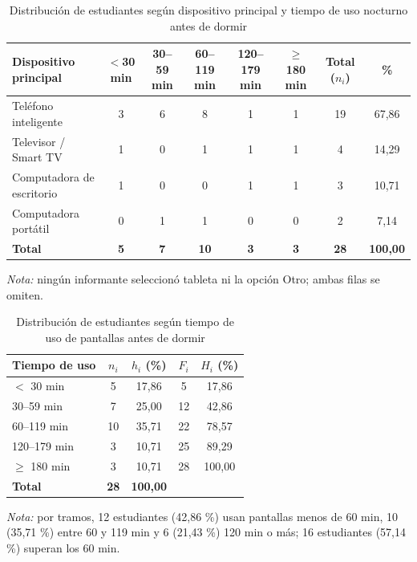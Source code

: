 \begin{table}[H]
\centering
\caption{Distribución de estudiantes según dispositivo principal y tiempo de uso nocturno antes de dormir}
\label{tab:c1}
\scriptsize
\setlength{\tabcolsep}{4pt}
\begin{tabular}{lccccccc}
\toprule
\textbf{Dispositivo principal} & \textbf{$<$30 min} & \textbf{30--59 min} & \textbf{60--119 min} & \textbf{120--179 min} & \textbf{$\ge$180 min} & \textbf{Total ($n_i$)} & \textbf{\%} \\
\midrule
Teléfono inteligente & 3 & 6 & 8 & 1 & 1 & 19 & 67,86 \\
Televisor / Smart TV & 1 & 0 & 1 & 1 & 1 & 4 & 14,29 \\
Computadora de escritorio & 1 & 0 & 0 & 1 & 1 & 3 & 10,71 \\
Computadora portátil & 0 & 1 & 1 & 0 & 0 & 2 & 7,14 \\
\midrule
\textbf{Total} & \textbf{5} & \textbf{7} & \textbf{10} & \textbf{3} & \textbf{3} & \textbf{28} & \textbf{100,00} \\
\bottomrule
\end{tabular}
\par\smallskip\parbox{0.92\linewidth}{\footnotesize\textit{Nota:} ningún informante seleccionó tableta ni la opción \guillemotleft Otro\guillemotright; ambas filas se omiten.}
\fuente
\end{table}

\begin{table}[H]
\centering
\caption{Distribución de estudiantes según tiempo de uso de pantallas antes de dormir}
\label{tab:c2}
\small
\begin{tabular}{lcccc}
\toprule
\textbf{Tiempo de uso} & \textbf{$n_i$} & \textbf{$h_i$ (\%)} & \textbf{$F_i$} & \textbf{$H_i$ (\%)} \\
\midrule
$<$ 30 min & 5 & 17,86 & 5 & 17,86 \\
30--59 min & 7 & 25,00 & 12 & 42,86 \\
60--119 min & 10 & 35,71 & 22 & 78,57 \\
120--179 min & 3 & 10,71 & 25 & 89,29 \\
$\ge$ 180 min & 3 & 10,71 & 28 & 100,00 \\
\midrule
\textbf{Total} & \textbf{28} & \textbf{100,00} &  &  \\
\bottomrule
\end{tabular}
\par\smallskip\parbox{0.92\linewidth}{\footnotesize\textit{Nota:} por tramos, 12 estudiantes (42,86 \%) usan pantallas menos de 60 min, 10 (35,71 \%) entre 60 y 119 min y 6 (21,43 \%) 120 min o más; 16 estudiantes (57,14 \%) superan los 60 min.}
\fuente
\end{table}


